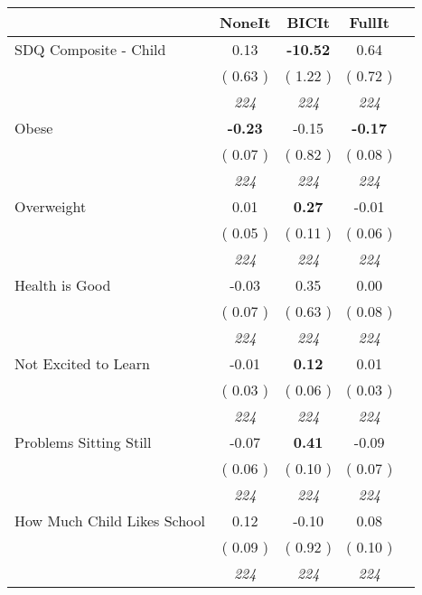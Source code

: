\begin{tabular}{l c c c c}
\toprule
 & NoneIt & BICIt & FullIt \\
\midrule
SDQ Composite - Child &      0.13 & \textbf{    -10.52 } &      0.64 \\
& (     0.63 ) & (     1.22 ) & (     0.72 ) \\
& \textit{ 224 } & \textit{ 224 } & \textit{ 224 } \\
Obese & \textbf{     -0.23 } &     -0.15 & \textbf{     -0.17 } \\
& (     0.07 ) & (     0.82 ) & (     0.08 ) \\
& \textit{ 224 } & \textit{ 224 } & \textit{ 224 } \\
Overweight &      0.01 & \textbf{      0.27 } &     -0.01 \\
& (     0.05 ) & (     0.11 ) & (     0.06 ) \\
& \textit{ 224 } & \textit{ 224 } & \textit{ 224 } \\
Health is Good &     -0.03 &      0.35 &      0.00 \\
& (     0.07 ) & (     0.63 ) & (     0.08 ) \\
& \textit{ 224 } & \textit{ 224 } & \textit{ 224 } \\
Not Excited to Learn &     -0.01 & \textbf{      0.12 } &      0.01 \\
& (     0.03 ) & (     0.06 ) & (     0.03 ) \\
& \textit{ 224 } & \textit{ 224 } & \textit{ 224 } \\
Problems Sitting Still &     -0.07 & \textbf{      0.41 } &     -0.09 \\
& (     0.06 ) & (     0.10 ) & (     0.07 ) \\
& \textit{ 224 } & \textit{ 224 } & \textit{ 224 } \\
How Much Child Likes School &      0.12 &     -0.10 &      0.08 \\
& (     0.09 ) & (     0.92 ) & (     0.10 ) \\
& \textit{ 224 } & \textit{ 224 } & \textit{ 224 } \\
\bottomrule
\end{tabular}
